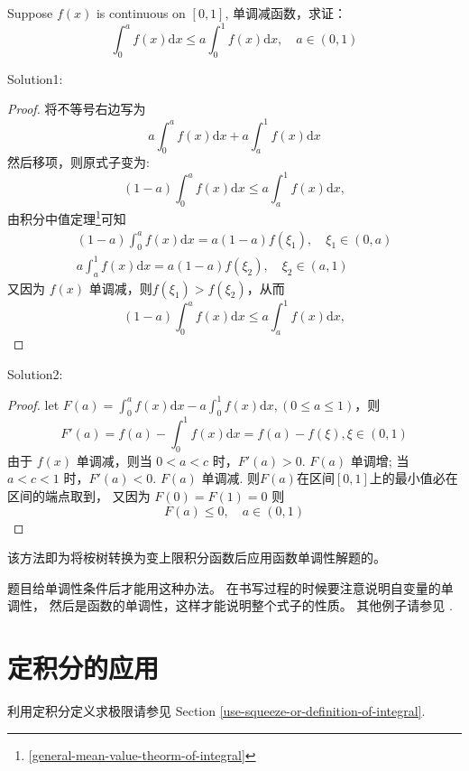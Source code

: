 \begin{example}
    Suppose $f(x)$ is continuous on $[0,1]$, 单调减函数，求证：
    \[
        \int_0^a f(x) \mathrm{d}x \leq a \int_0^1 f(x) \mathrm{d}x, \quad a \in (0, 1)
    \]
    \cite[page 119, pdf 130, example 2]{we}

    Solution1:
    \begin{proof}
        将不等号右边写为
        \[
            a\int_0^a f(x) \mathrm{d}x + a\int_a^1 f(x) \mathrm{d}x
        \]
        然后移项，则原式子变为:
        \[
            (1-a) \int_0^a f(x) \mathrm{d}x \leq a \int_a^1 f(x) \mathrm{d}x,
        \]
        由积分中值定理\footnote{\ref{general-mean-value-theorm-of-integral}}可知
        \begin{align}
            (1-a) \int_0^a f(x) \mathrm{d}x = a(1-a)f(\xi_1), \quad \xi_1 \in (0, a)\\
            a \int_a^1 f(x) \mathrm{d}x = a(1-a)f(\xi_2), \quad \xi_2 \in (a, 1)
        \end{align}
        又因为 $f(x)$ 单调减，则$f(\xi_1) > f(\xi_2)$，从而
        \[
            (1-a) \int_0^a f(x) \mathrm{d}x \leq a \int_a^1 f(x) \mathrm{d}x,
        \]
    \end{proof}

    Solution2:
    \begin{proof}
        let $F(a) = \int_0^a f(x) \mathrm{d}x - a\int_0^1 f(x) \mathrm{d}x, (0 \leq a \leq 1)$，则
        \[
            F'(a) = f(a) -  \int_0^1 f(x)\mathrm{d}x = f(a) - f(\xi), \xi \in (0,1)
        \]
        由于 $f(x)$ 单调减，则当 $0<a<c$ 时，$F'(a) > 0$.
        $F(a)$ 单调增;
        当 $a<c<1$ 时，$F'(a) < 0$.
        $F(a)$ 单调减.
        则$F(a)$在区间$[0,1]$上的最小值必在区间的端点取到，
        又因为 $F(0) = F(1) =0$ 则
        \[
            F(a) \leq 0, \quad a \in (0, 1)
        \]
    \end{proof}
    该方法即为将桉树转换为变上限积分函数后应用函数单调性解题的。
\end{example}

题目给单调性条件后才能用这种办法。
在书写过程的时候要注意说明自变量的单调性，
然后是函数的单调性，这样才能说明整个式子的性质。
其他例子请参见 \cite[page 119, pdf 130]{we}.

\section{定积分的应用}\label{app-finite-integral}

利用定积分定义求极限请参见
Section \ref{use-squeeze-or-definition-of-integral}.

